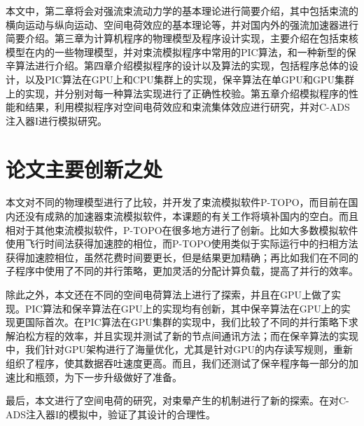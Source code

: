 本文中，第二章将会对强流束流动力学的基本理论进行简要介绍，其中包括束流的横向运动与纵向运动、空间电荷效应的基本理论等，并对国内外的强流加速器进行简要介绍。第三章为计算机程序的物理模型及程序设计实现，主要介绍在包括束核模型在内的一些物理模型，并对束流模拟程序中常用的PIC算法，和一种新型的保辛算法进行介绍。第四章介绍模拟程序的设计以及算法的实现，包括程序总体的设计，以及PIC算法在GPU上和CPU集群上的实现，保辛算法在单GPU和GPU集群上的实现，并分别对每一种算法实现进行了正确性校验。第五章介绍模拟程序的性能和结果，利用模拟程序对空间电荷效应和束流集体效应进行研究，并对C-ADS注入器I进行模拟研究。

\section{论文主要创新之处}
本文对不同的物理模型进行了比较，并开发了束流模拟软件P-TOPO，而目前在国内还没有成熟的加速器束流模拟软件，本课题的有关工作将填补国内的空白。而且相对于其他束流模拟软件，P-TOPO在很多地方进行了创新。比如大多数模拟软件使用飞行时间法获得加速腔的相位，而P-TOPO使用类似于实际运行中的扫相方法获得加速腔相位，虽然花费时间要更长，但是结果更加精确；再比如我们在不同的子程序中使用了不同的并行策略，更加灵活的分配计算负载，提高了并行的效率。

除此之外，本文还在不同的空间电荷算法上进行了探索，并且在GPU上做了实现。PIC算法和保辛算法在GPU上的实现均有创新，其中保辛算法在GPU上的实现更国际首次。在PIC算法在GPU集群的实现中，我们比较了不同的并行策略下求解泊松方程的效率，并且实现并测试了新的节点间通讯方法；而在保辛算法的实现中，我们针对GPU架构进行了海量优化，尤其是针对GPU的内存读写规则，重新组织了程序，使其数据吞吐速度更高。而且，我们还测试了保辛程序每一部分的加速比和瓶颈，为下一步升级做好了准备。

最后，本文进行了空间电荷的研究，对束晕产生的机制进行了新的探索。在对C-ADS注入器I的模拟中，验证了其设计的合理性。
